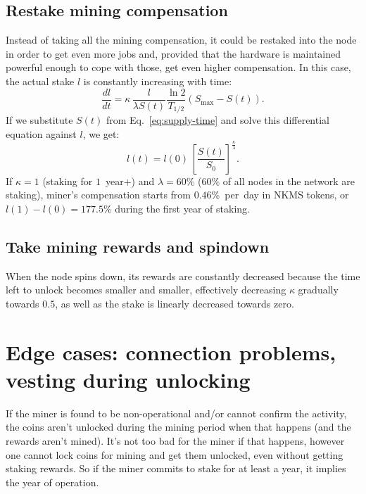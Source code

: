 \documentclass[longbibliography,nofootinbib,twocolumn]{revtex4-1}
\begin{document}
\subsection{Restake mining compensation}

Instead of taking all the mining compensation, it could be restaked into the node in order to get even more jobs and, provided that the hardware is maintained
powerful enough to cope with those, get even higher compensation.
In this case, the actual stake $l$ is constantly increasing with time:
\begin{equation}
    \frac{dl}{dt} =  \kappa\, \frac{l}{\lambda S(t)} \frac{\ln{2}}{T_{1/2}} \left( S_{\max} - S(t)\right).
\end{equation}
If we substitute $S(t)$ from Eq.~\ref{eq:supply-time} and solve this differential equation against $l$, we get:
\begin{equation}
    l(t) = l(0)\,\left[ \frac{S(t)}{S_0} \right]^{\frac{\kappa}{\lambda}}.
\end{equation}
If $\kappa=1$ (staking for $1$~year+) and $\lambda=60\%$ ($60\%$ of all nodes in the network are staking),
miner's compensation starts from $0.46\%$~per~day in NKMS tokens,
or $l(1) - l(0) = 177.5\%$ during the first year of staking.

\subsection{Take mining rewards and spindown}

When the node spins down, its rewards are constantly decreased because the time left to unlock becomes smaller and smaller,
effectively decreasing $\kappa$ gradually towards $0.5$,
as well as the stake is linearly decreased towards zero.

\section{Edge cases: connection problems, vesting during unlocking}

If the miner is found to be non-operational and/or cannot confirm the activity, the coins aren't unlocked during the mining period when that happens (and the
rewards aren't mined).
It's not too bad for the miner if that happens, however one cannot lock coins for mining and get them unlocked, even without getting staking rewards.
So if the miner commits to stake for at least a year, it implies the year of operation.
\end{document}
